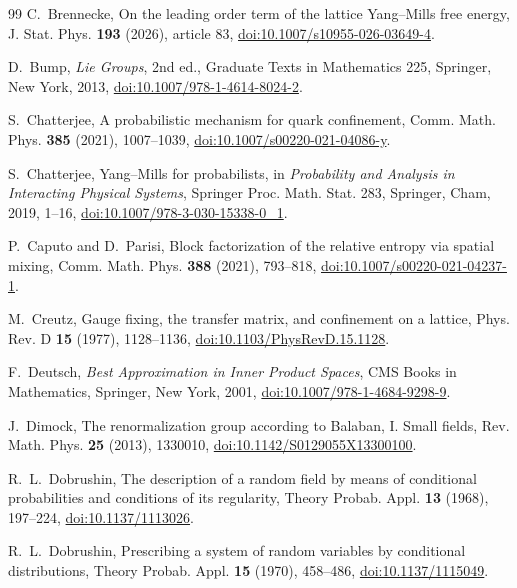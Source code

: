\begin{thebibliography}{99}
C.~Brennecke, On the leading order term of the lattice Yang--Mills free energy,
J. Stat. Phys. \textbf{193} (2026), article 83,
\href{https://doi.org/10.1007/s10955-026-03649-4}{doi:10.1007/s10955-026-03649-4}.

D.~Bump, \emph{Lie Groups}, 2nd ed., Graduate Texts in Mathematics 225,
Springer, New York, 2013,
\href{https://doi.org/10.1007/978-1-4614-8024-2}{doi:10.1007/978-1-4614-8024-2}.

S.~Chatterjee, A probabilistic mechanism for quark confinement, Comm. Math. Phys. \textbf{385} (2021), 1007--1039, \href{https://doi.org/10.1007/s00220-021-04086-y}{doi:10.1007/s00220-021-04086-y}.

S.~Chatterjee, Yang--Mills for probabilists, in \emph{Probability and Analysis in Interacting Physical Systems}, Springer Proc. Math. Stat. 283, Springer, Cham, 2019, 1--16, \href{https://doi.org/10.1007/978-3-030-15338-0_1}{doi:10.1007/978-3-030-15338-0\_1}.

P.~Caputo and D.~Parisi, Block factorization of the relative entropy via spatial mixing, Comm. Math. Phys. \textbf{388} (2021), 793--818, \href{https://doi.org/10.1007/s00220-021-04237-1}{doi:10.1007/s00220-021-04237-1}.

M.~Creutz, Gauge fixing, the transfer matrix, and confinement on a lattice,
Phys. Rev. D \textbf{15} (1977), 1128--1136,
\href{https://doi.org/10.1103/PhysRevD.15.1128}{doi:10.1103/PhysRevD.15.1128}.

F.~Deutsch, \emph{Best Approximation in Inner Product Spaces}, CMS Books in Mathematics, Springer, New York, 2001, \href{https://doi.org/10.1007/978-1-4684-9298-9}{doi:10.1007/978-1-4684-9298-9}.

J.~Dimock, The renormalization group according to Balaban, I. Small fields, Rev. Math. Phys. \textbf{25} (2013), 1330010, \href{https://doi.org/10.1142/S0129055X13300100}{doi:10.1142/S0129055X13300100}.

R.~L.~Dobrushin, The description of a random field by means of conditional
probabilities and conditions of its regularity, Theory Probab. Appl.
\textbf{13} (1968), 197--224,
\href{https://doi.org/10.1137/1113026}{doi:10.1137/1113026}.

R.~L.~Dobrushin, Prescribing a system of random variables by conditional
distributions, Theory Probab. Appl. \textbf{15} (1970), 458--486,
\href{https://doi.org/10.1137/1115049}{doi:10.1137/1115049}.


\end{thebibliography}
